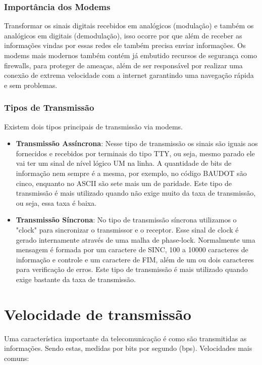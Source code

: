 \documentclass[12pt,a4, oneside, brazil]{article}
\begin{document}
\subsubsection{Importância dos Modems}
Transformar os sinais digitais recebidos em analógicos (modulação) e também os analógicos em digitais (demodulação), isso ocorre por que além de receber as informações vindas por essas redes ele também precisa enviar informações. Os modems mais modernos também contém já embutido recursos de segurança como firewalls, para proteger de ameaças, além de ser responsável por realizar uma conexão de extrema velocidade com a internet garantindo uma navegação rápida e sem problemas.

\subsubsection{Tipos de Transmissão}
Existem dois tipos principais de transmissão via modems.

\begin{itemize}
	\item \textbf{Transmissão Assíncrona}:  Nesse tipo de transmissão os sinais são iguais aos fornecidos e recebidos por terminais do tipo TTY, ou seja, mesmo parado ele vai ter um sinal de nível lógico UM na linha. A quantidade de bits de informação nem sempre é a mesma, por exemplo, no código BAUDOT são cinco, enquanto no ASCII são sete mais um de paridade. Este tipo de transmissão é mais utilizado quando não exige muito da taxa de transmissão, ou seja, essa taxa é baixa.
	\item \textbf{Transmissão Síncrona}: No tipo de transmissão síncrona utilizamos o "clock" para sincronizar o transmissor e o receptor. Esse sinal de clock é gerado internamente através de uma malha de phase-lock. Normalmente uma mensagem é formada por um caractere de SINC, 100 a 10000 caracteres de informação e controle e um caractere de FIM, além de um ou dois caracteres para verificação de erros. Este tipo de transmissão é mais utilizado quando exige bastante da taxa de transmissão.
\end{itemize} 



	\section{Velocidade de transmissão}
	Uma característica importante da telecomunicação é como são transmitidas as informações. Sendo estas, medidas por bits por segundo (bps). Velocidades mais comuns:
	
\end{document}
